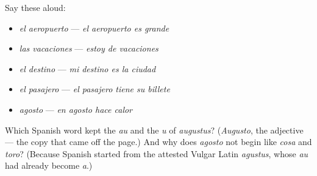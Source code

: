 Say these aloud:

\begin{itemize}
\raggedright
  \item \emph{el aeropuerto} — \emph{el aeropuerto es grande}
  \item \emph{las vacaciones} — \emph{estoy de vacaciones}
  \item \emph{el destino} — \emph{mi destino es la ciudad}
  \item \emph{el pasajero} — \emph{el pasajero tiene su billete}
  \item \emph{agosto} — \emph{en agosto hace calor}
\end{itemize}

\begin{tcolorbox}[breakable,colback=teal!4,colframe=teal!35!black,title={Before you move on}]
Which Spanish word kept the \emph{au} and the \emph{u} of \emph{augustus}? (\emph{Augusto}, the adjective — the copy that came off the page.) And why does \emph{agosto} not begin like \emph{cosa} and \emph{toro}? (Because Spanish started from the attested Vulgar Latin \emph{agustus}, whose \emph{au} had already become \emph{a}.)
\end{tcolorbox}
